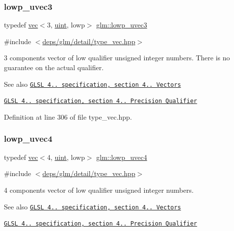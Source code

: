 \subsubsection{\texorpdfstring{lowp\+\_\+uvec3}{lowp\_uvec3}}
{\footnotesize\ttfamily typedef \hyperlink{structglm_1_1vec}{vec}$<$3, \hyperlink{group__core__precision_ga4fd29415871152bfb5abd588334147c8}{uint}, lowp$>$ \hyperlink{group__core__precision_gab06a83e99d38e15a3e54d38208b9deba}{glm\+::lowp\+\_\+uvec3}}



{\ttfamily \#include $<$\hyperlink{type__vec_8hpp}{deps/glm/detail/type\+\_\+vec.\+hpp}$>$}

3 components vector of low qualifier unsigned integer numbers. There is no guarantee on the actual qualifier.

\begin{DoxySeeAlso}{See also}
\href{http://www.opengl.org/registry/doc/GLSLangSpec.4.20.8.pdf}{\tt G\+L\+SL 4.. specification, section 4.. Vectors} 

\href{http://www.opengl.org/registry/doc/GLSLangSpec.4.20.8.pdf}{\tt G\+L\+SL 4.. specification, section 4.. Precision Qualifier} 
\end{DoxySeeAlso}


Definition at line 306 of file type\+\_\+vec.\+hpp.

\mbox{\label{group__core__precision_ga0ecd5668a8e001e14a9dab2cffd09285}} 
\subsubsection{\texorpdfstring{lowp\+\_\+uvec4}{lowp\_uvec4}}
{\footnotesize\ttfamily typedef \hyperlink{structglm_1_1vec}{vec}$<$4, \hyperlink{group__core__precision_ga4fd29415871152bfb5abd588334147c8}{uint}, lowp$>$ \hyperlink{group__core__precision_ga0ecd5668a8e001e14a9dab2cffd09285}{glm\+::lowp\+\_\+uvec4}}



{\ttfamily \#include $<$\hyperlink{type__vec_8hpp}{deps/glm/detail/type\+\_\+vec.\+hpp}$>$}

4 components vector of low qualifier unsigned integer numbers.

\begin{DoxySeeAlso}{See also}
\href{http://www.opengl.org/registry/doc/GLSLangSpec.4.20.8.pdf}{\tt G\+L\+SL 4.. specification, section 4.. Vectors} 

\href{http://www.opengl.org/registry/doc/GLSLangSpec.4.20.8.pdf}{\tt G\+L\+SL 4.. specification, section 4.. Precision Qualifier} 
\end{DoxySeeAlso}


